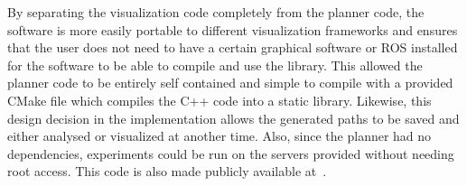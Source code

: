 By separating the visualization code completely from the planner code, the
software is more easily portable to different visualization frameworks and
ensures that the user does not need to have a certain graphical software or ROS
installed for the software to be able to compile and use the library. This
allowed the planner code to be entirely self contained and simple to compile
with a provided CMake file which compiles the C++ code into a static library.
Likewise, this design decision in the implementation allows the generated paths
to be saved and either analysed or visualized at another time.  Also, since the
planner had no dependencies, experiments could be run on the servers provided
without needing root access.  This code is also made publicly available
at~\cite{dodger}.


